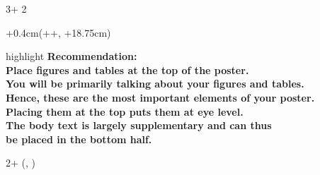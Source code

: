 \documentclass{beamer}
\newlength{\blockOne}
\newlength{\blockTwo}
\begin{document}
\begin{frame}[t]
\begin{textblock*}{3\colwidth + 2\colsep}
\end{textblock*}

\TPshowboxesfalse
\begin{textblock*}{\colwidth+0.4cm}(\leftmargin+\colwidth+\colsep-0.2cm, \blockOne+18.75cm)
	\begin{beamercolorbox}[sep = 25pt, center]{highlight}
		\sffamily\bfseries\small%
		Recommendation: \\
		Place figures and tables at the top of the poster. \\[\medskipamount]
		\mdseries
		You will be primarily talking about your figures and tables. \\
		Hence, these are the most important elements of your poster. \\
		Placing them at the top puts them at eye level. \\
		The body text is largely supplementary and can thus \\
		be placed in the bottom half.
	\end{beamercolorbox}
\end{textblock*}
\TPshowboxestrue




\begin{textblock*}{2\colwidth + \colsep}(\leftmargin, \blockTwo)


\end{textblock*}
\end{frame}
\end{document}
